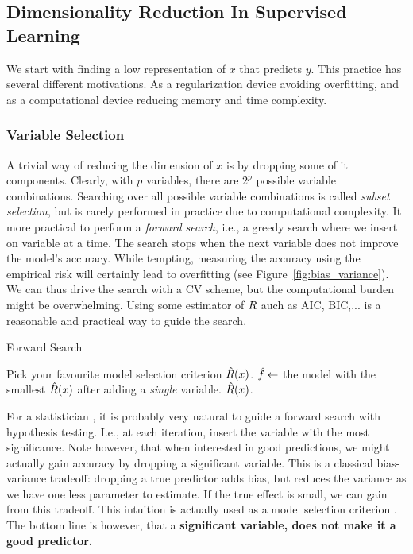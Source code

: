 \subsection{Dimensionality Reduction In Supervised Learning}
\label{sec:dim_reduce_supervised}
We start with finding a low representation of $x$ that predicts $y$.
This practice has several different motivations. As a regularization device avoiding overfitting, and  as a computational device reducing memory and time complexity. 

\subsubsection{Variable Selection}
A trivial way of reducing the dimension of $x$ is by dropping some of it components. 
Clearly, with $p$ variables, there are $2^p$ possible variable combinations. Searching over all possible variable combinations is called \emph{subset selection}, but is rarely performed in practice due to computational complexity. It more practical to perform a \emph{forward search}, i.e., a greedy search where we insert on variable at a time.
The search stops when the next variable does not improve the model's accuracy. 
While tempting, measuring the accuracy using the empirical risk will certainly lead to overfitting (see Figure~\ref{fig:bias_variance}).
We can thus drive the search with a CV scheme, but the computational burden might be overwhelming. Using some estimator of $R$ auch as AIC, BIC,... is a reasonable and practical way to guide the search.


\begin{algorithm}[H]
\caption{Forward Search}
\begin{algorithmic}
\State Pick your favourite model selection criterion $\hat{R}(x)$.
    \State $\hat{f} \gets$ the model with the smallest $\hat{R}(x)$ after adding a \emph{single} variable.
\EndWhile
\State \Return $\hat{R}(x)$.
\end{algorithmic}
\end{algorithm}



\begin{remark}
For a statistician , it is probably very natural to guide a forward search with hypothesis testing. I.e., at each iteration, insert the variable with the most significance. 
Note however, that when interested in good predictions, we might actually gain accuracy by dropping a significant variable. This is a classical bias-variance tradeoff: dropping a true predictor adds bias, but reduces the variance as we have one less parameter to estimate. If the true effect is small, we can gain from this tradeoff. 
This intuition is actually used as a model selection criterion \citep{foster_variable_2004}.
The bottom line is however, that a \textbf{significant variable, does not make it a good predictor.} 
\end{remark}

